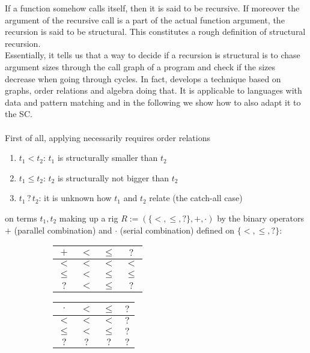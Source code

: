 If a function somehow calls itself, then it is said to be recursive.
If moreover the argument of the recursive call is a part of the actual function argument, the recursion is said to be structural.
This constitutes a rough definition of structural recursion.
\\
Essentially, it tells us that a way to decide if a recursion is structural is to chase argument sizes through the call graph of a program and check if the sizes decrease when going through cycles.
In fact, \cite{foetus} develops a technique based on graphs, order relations and algebra doing that.
It is applicable to languages with data and pattern matching and in the following we show how to also adapt it to the SC.
\\
\\
First of all, applying \cite{foetus} necessarily requires order relations
\begin{enumerate}
  \item
    $t_{1} < t_{2}$: $t_{1}$ is structurally smaller than $t_{2}$
  \item
    $t_{1} \leq t_{2}$: $t_{2}$ is structurally not bigger than $t_{2}$
  \item
    $t_{1} \, ? \, t_{2}$: it is unknown how $t_{1}$ and $t_{2}$ relate (the catch-all case)
\end{enumerate}
on terms $t_{1}, t_{2}$ making up a rig $R :=( \{ <,\leq,? \},+,\cdot )$ by the binary operators $+$ (parallel combination) and $\cdot$ (serial combination) defined on $\{ <,\leq,? \}$:

\begin{figure}[H]
  \begin{subfigure}[t]{0.3\textwidth}
    \scriptsize
    \begin{tabular}{c|ccc}
        $+$
      & $<$
      & $\leq$
      & $?$
      \\
      \hline
        $<$
      & $<$
      & $<$
      & $<$
      \\
        $\leq$
      & $<$
      & $\leq$ &
      $\leq$
      \\
        $?$
      & $<$
      & $\leq$
      & $?$
      \\
    \end{tabular}
  \end{subfigure}
  \begin{subfigure}[t]{0.3\textwidth}
    \scriptsize
    \begin{tabular}{c|ccc}
        $\cdot$
      & $<$
      & $\leq$
      & $?$
      \\
      \hline
        $<$
      & $<$
      & $<$
      & $?$
      \\
        $\leq$
      & $<$
      & $\leq$
      & $?$
      \\
        $?$
      & $?$
      & $?$
      & $?$
      \\
    \end{tabular}
  \end{subfigure}
\end{figure}

